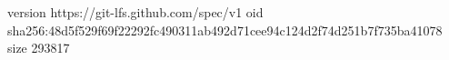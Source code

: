 version https://git-lfs.github.com/spec/v1
oid sha256:48d5f529f69f22292fc490311ab492d71cee94c124d2f74d251b7f735ba41078
size 293817
